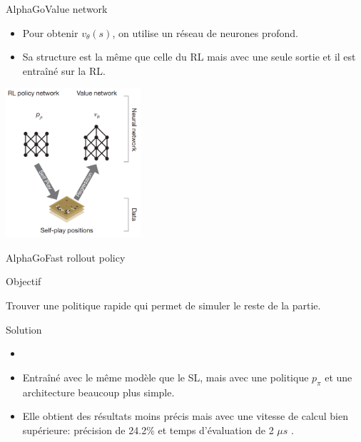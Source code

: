 \begin{frame}{AlphaGo}{Value network}
    \begin{itemize}
        \item Pour obtenir $v_\theta(s)$, on utilise un réseau de neurones profond.
        \item Sa structure est la même que celle du RL mais avec une seule sortie et il est entraîné sur la RL.
    \end{itemize}
    \begin{center}
        \includegraphics[width=5cm]{ressources/AlphaGo/RL_and_VN}
    \end{center}
\end{frame}

\begin{frame}{AlphaGo}{Fast rollout policy}
    \begin{block}{Objectif}
        \begin{center}
            Trouver une politique rapide qui permet de simuler le reste de la partie.
        \end{center}
    \end{block}
    \pause
    \begin{block}{Solution}
        \begin{itemize}
            \item
            \item Entraîné avec le même modèle que le SL, mais avec une politique $p_\pi$ et une architecture beaucoup plus simple.
            \item Elle obtient des résultats moins précis mais avec une vitesse de calcul bien supérieure: précision de 24.2\% et temps d'évaluation de 2 $\mu s$ .
        \end{itemize}
    \end{block}
\end{frame}


